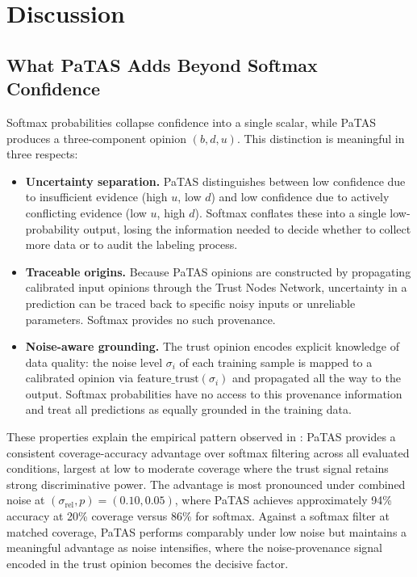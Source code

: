 \section{Discussion}
\label{sec:discussion}
\subsection{What \ac{PaTAS} Adds Beyond Softmax Confidence}
\label{sec:discussion_softmax}

Softmax probabilities collapse confidence into a single scalar, while \ac{PaTAS} produces a three-component opinion $(b, d, u)$. This distinction is meaningful in three respects:

\begin{itemize}
    \item \textbf{Uncertainty separation.} \ac{PaTAS} distinguishes between low confidence due to insufficient evidence (high $u$, low $d$) and low confidence due to actively conflicting evidence (low $u$, high $d$). Softmax conflates these into a single low-probability output, losing the information needed to decide whether to collect more data or to audit the labeling process.
    \item \textbf{Traceable origins.} Because \ac{PaTAS} opinions are constructed by propagating calibrated input opinions through the Trust Nodes Network, uncertainty in a prediction can be traced back to specific noisy inputs or unreliable parameters. Softmax provides no such provenance.
    \item \textbf{Noise-aware grounding.} The trust opinion encodes explicit knowledge of data quality: the noise level $\sigma_i$ of each training sample is mapped to a calibrated opinion via $\text{feature\_trust}(\sigma_i)$ and propagated all the way to the output. Softmax probabilities have no access to this provenance information and treat all predictions as equally grounded in the training data.
\end{itemize}

These properties explain the empirical pattern observed in  : \ac{PaTAS} provides a consistent coverage-accuracy advantage over softmax filtering across all evaluated conditions, largest at low to moderate coverage where the trust signal retains strong discriminative power. The advantage is most pronounced under combined noise at $(\sigma_{\text{rel}}, p) = (0.10, 0.05)$, where \ac{PaTAS} achieves approximately 94\% accuracy at 20\% coverage versus 86\% for softmax. Against a softmax filter at matched coverage, \ac{PaTAS} performs comparably under low noise but maintains a meaningful advantage as noise intensifies, where the noise-provenance signal encoded in the trust opinion becomes the decisive factor.


